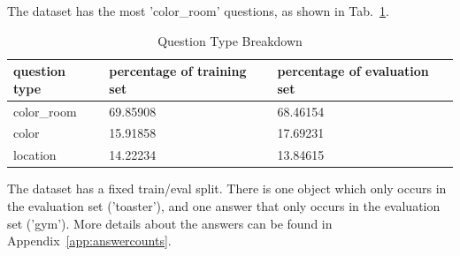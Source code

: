 The dataset has the most 'color\_room' questions, as shown in Tab.~\ref{tab:q_breakdown}.

\begin{table}[h]
\centering
\caption{Question Type Breakdown}
\begin{tabular}{ |l|l|l| }
\hline
\textbf{question type} & \textbf{percentage of training set} & \textbf{percentage of evaluation set} \\
\hline
color\_room & 69.85908 & 68.46154\\
color & 15.91858 & 17.69231\\
location & 14.22234 & 13.84615\\
\hline
\end{tabular}
\label{tab:q_breakdown}
\end{table}

The dataset has a fixed train/eval split. There is one object which only occurs in the evaluation set ('toaster'), and one answer that only occurs in the evaluation set ('gym'). More details about the answers can be found in Appendix~\ref{app:answercounts}.

